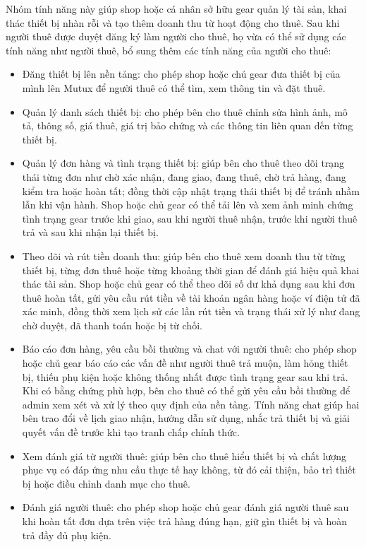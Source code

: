 Nhóm tính năng này giúp shop hoặc cá nhân sở hữu gear quản lý tài sản, khai thác thiết bị nhàn rỗi và tạo thêm doanh thu từ hoạt động cho thuê.
Sau khi người thuê được duyệt đăng ký làm người cho thuê, họ vừa có thể sử dụng các tính năng như người thuê, bổ sung thêm các tính năng của người cho thuê:
\begin{itemize}
    \item Đăng thiết bị lên nền tảng: cho phép shop hoặc chủ gear đưa thiết bị của mình lên Mutux để người thuê có thể tìm, xem thông tin và đặt thuê.
    \item Quản lý danh sách thiết bị: cho phép bên cho thuê chỉnh sửa hình ảnh, mô tả, thông số, giá thuê, giá trị bảo chứng và các thông tin liên quan đến từng thiết bị.
    \item Quản lý đơn hàng và tình trạng thiết bị: giúp bên cho thuê theo dõi trạng thái từng đơn như chờ xác nhận, đang giao, đang thuê, chờ trả hàng, đang kiểm tra hoặc hoàn tất; đồng thời cập nhật trạng thái thiết bị để tránh nhầm lẫn khi vận hành. Shop hoặc chủ gear có thể tải lên và xem ảnh minh chứng tình trạng gear trước khi giao, sau khi người thuê nhận, trước khi người thuê trả và sau khi nhận lại thiết bị.
    \item Theo dõi và rút tiền doanh thu: giúp bên cho thuê xem doanh thu từ từng thiết bị, từng đơn thuê hoặc từng khoảng thời gian để đánh giá hiệu quả khai thác tài sản. Shop hoặc chủ gear có thể theo dõi số dư khả dụng sau khi đơn thuê hoàn tất, gửi yêu cầu rút tiền về tài khoản ngân hàng hoặc ví điện tử đã xác minh, đồng thời xem lịch sử các lần rút tiền và trạng thái xử lý như đang chờ duyệt, đã thanh toán hoặc bị từ chối.
    \item Báo cáo đơn hàng, yêu cầu bồi thường và chat với người thuê: cho phép shop hoặc chủ gear báo cáo các vấn đề như người thuê trả muộn, làm hỏng thiết bị, thiếu phụ kiện hoặc không thống nhất được tình trạng gear sau khi trả. Khi có bằng chứng phù hợp, bên cho thuê có thể gửi yêu cầu bồi thường để admin xem xét và xử lý theo quy định của nền tảng. Tính năng chat giúp hai bên trao đổi về lịch giao nhận, hướng dẫn sử dụng, nhắc trả thiết bị và giải quyết vấn đề trước khi tạo tranh chấp chính thức.
    \item Xem đánh giá từ người thuê: giúp bên cho thuê hiểu thiết bị và chất lượng phục vụ có đáp ứng nhu cầu thực tế hay không, từ đó cải thiện, bảo trì thiết bị hoặc điều chỉnh danh mục cho thuê.
    \item Đánh giá người thuê: cho phép shop hoặc chủ gear đánh giá người thuê sau khi hoàn tất đơn dựa trên việc trả hàng đúng hạn, giữ gìn thiết bị và hoàn trả đầy đủ phụ kiện.
\end{itemize}


